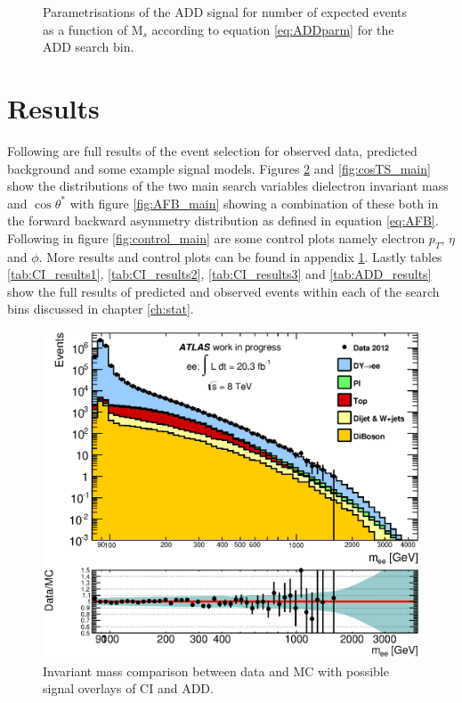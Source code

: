 	\begin{figure}[h]
	    \begin{center}
	    \end{center}
	   \caption{Parametrisations of the ADD signal for number of expected events as a function of M$_{s}$ according to equation \ref{eq:ADDparm} for the ADD search bin.}
	   \label{fig:ADDparm}
	\end{figure}


\section{Results}

	Following are full results of the event selection for observed data, predicted background and some example signal models. Figures \ref{fig:invMass_main} and \ref{fig:cosTS_main} show the distributions of the two main search variables dielectron invariant mass and $\cos{\theta^{*}}$ with figure \ref{fig:AFB_main} showing a combination of these both in the forward backward asymmetry distribution as defined in equation \ref{eq:AFB}. Following in figure \ref{fig:control_main} are some control plots namely electron $p_{T}$, $\eta$ and $\phi$. More results and control plots can be found in appendix \ref{}. Lastly tables \ref{tab:CI_results1}, \ref{tab:CI_results2}, \ref{tab:CI_results3} and \ref{tab:ADD_results} show the full results of predicted and observed events within each of the search bins discussed in chapter \ref{ch:stat}.


	\begin{figure}[h]
	    \begin{center}
	    	\includegraphics[scale=0.6]{images/invMass_main.eps}
	    \end{center}
	   \caption{Invariant mass comparison between data and MC with possible signal overlays of CI and ADD.}
	   \label{fig:invMass_main}
	\end{figure}

